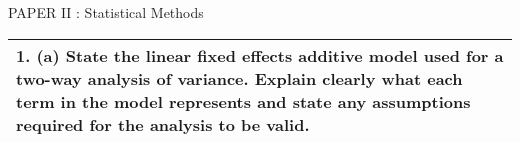 \documentclass[a4paper,12pt]{article}
\begin{document}
PAPER II : Statistical Methods
\begin{table}[ht!]
 
\centering
 
\begin{tabular}{|p{15cm}|}
 
\hline  

1. (a) State the linear fixed effects additive model used for a two-way analysis of variance.  Explain clearly what each term in the model represents and state any assumptions required for the analysis to be valid.

\\ \hline
  
\end{tabular}

\end{table}
\end{document}
